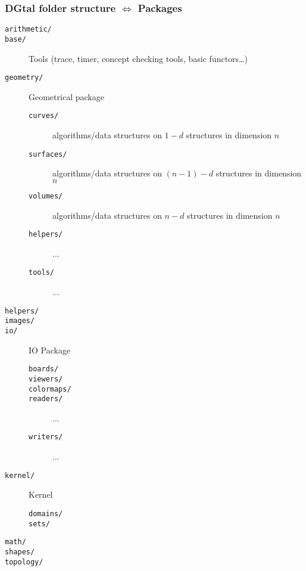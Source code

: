 \documentclass[8pt]{beamer}
\begin{document}
\begin{frame}
  \frametitle{DGtal folder structure $\Leftrightarrow$ Packages  }

  \begin{description}

  \item[ \tt arithmetic/] 
  \item[ \tt base/] Tools (trace, timer, concept checking tools, basic functors\ldots)
  \item[ \tt geometry/] Geometrical package
    \begin{description}
        \item[ \tt curves/] algorithms/data structures on $1-d$ structures in dimension $n$
        \item[ \tt surfaces/] algorithms/data structures on $(n-1)-d$ structures in dimension $n$
        \item[ \tt volumes/] algorithms/data structures on $n-d$ structures in dimension $n$
        \item[ \tt helpers/] ...
        \item[ \tt tools/] ...
    \end{description}
  \item[ \tt helpers/]
  \item[ \tt images/]
  \item[ \tt io/] IO Package
   \begin{description}
        \item[ \tt boards/]
        \item[ \tt viewers/]
        \item[ \tt colormaps/]
        \item[ \tt readers/] ...
        \item[ \tt writers/] ...
   \end{description}
  \item[ \tt kernel/] Kernel
   \begin{description}
        \item[ \tt domains/]
        \item[ \tt sets/]
   \end{description}  \item[ \tt math/]
  \item[ \tt shapes/]
    \item[ \tt topology/] 
  \end{description}
\end{frame}
\end{document}
